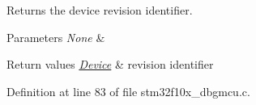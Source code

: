 Returns the device revision identifier. 


\begin{DoxyParams}{Parameters}
{\em None} & \\
\hline
\end{DoxyParams}

\begin{DoxyRetVals}{Return values}
{\em \hyperlink{struct_device}{Device}} & revision identifier \\
\hline
\end{DoxyRetVals}


Definition at line 83 of file stm32f10x\-\_\-dbgmcu.\-c.

